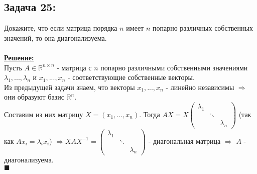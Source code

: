 \documentclass[a4paper,12pt,titlepage,final]{article}
\begin{document}
\subsection*{Задача 25:}
\noindent Докажите, что если матрица порядка $n$ имеет $n$ попарно различных собственных значений, то она диагонализуема. \\ \\
\textbf{\underline{Решение:}} \\
Пусть $A \in \mathbb{R}^{n \times n}$ - матрица с $n$ попарно различными собственными значениями $\lambda_1, ... , \lambda_n$ и 
$x_1, ... , x_n$ - соответствующие собственные векторы. \\
Из предыдущей задачи знаем, что векторы $x_1, ... , x_n$ - линейно независимы $\Rightarrow$ они образуют
базис $\mathbb{R}^n$. \\
Составим из них матрицу $X = (x_1, ... , x_n)$.
Тогда $AX = X
\begin{pmatrix}
    \lambda_1 & & \\
     & \ddots & \\
     & & \lambda_n
\end{pmatrix}
$ (так как $Ax_i = \lambda_i x_i$) $\Rightarrow XAX^{-1} =
\begin{pmatrix}
    \lambda_1 & & \\
     & \ddots & \\
     & & \lambda_n
\end{pmatrix}$ - диагональная матрица $\Rightarrow$ $A$ - диагонализуема. \\ $\blacksquare$ \\ \\ \\
\end{document}
